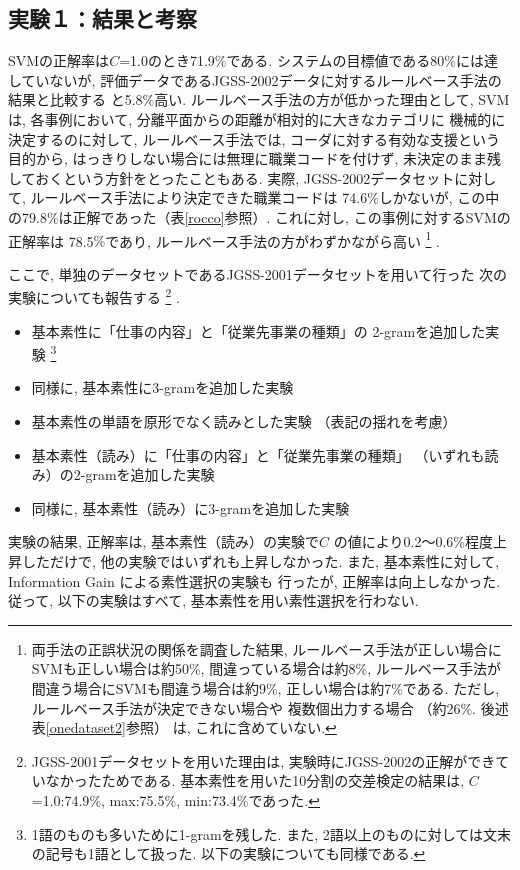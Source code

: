 \documentclass{nlp}
\begin{document}
\subsection{実験１：結果と考察}
SVMの正解率は$C$=1.0のとき71.9$\%$である. 
システムの目標値である80$\%$には達していないが, 
評価データであるJGSS-2002データに対するルールベース手法の結果と比較する
と5.8$\%$高い. 
ルールベース手法の方が低かった理由として, 
SVMは, 各事例において, 
分離平面からの距離が相対的に大きなカテゴリに
機械的に決定するのに対して, 
ルールベース手法では, 
コーダに対する有効な支援という目的から, 
はっきりしない場合には無理に職業コードを付けず, 
未決定のまま残しておくという方針をとったこともある. 
実際, JGSS-2002データセットに対して, 
ルールベース手法により決定できた職業コードは
74.6$\%$しかないが, 
この中の79.8$\%$は正解であった（表\ref{rocco}参照）. 
これに対し, この事例に対するSVMの正解率は
78.5$\%$であり, 
ルールベース手法の方がわずかながら高い
\footnote{
両手法の正誤状況の関係を調査した結果, 
ルールベース手法が正しい場合にSVMも正しい場合は約50$\%$, 
間違っている場合は約8$\%$, 
ルールベース手法が間違う場合にSVMも間違う場合は約9$\%$,
正しい場合は約7$\%$である. 
ただし, ルールベース手法が決定できない場合や
複数個出力する場合
（約26$\%$. 後述表\ref{onedataset2}参照）
は, これに含めていない. }
. 
 
ここで, 単独のデータセットであるJGSS-2001データセットを用いて行った
次の実験についても報告する
\footnote{JGSS-2001データセットを用いた理由は, 
実験時にJGSS-2002の正解ができていなかったためである. 
基本素性を用いた10分割の交差検定の結果は, 
$C$=1.0:74.9$\%$, max:75.5$\%$, min:73.4$\%$であった. }
. 

\begin{itemize}
\item 基本素性に「仕事の内容」と「従業先事業の種類」の
2-gramを追加した実験
\footnote{1語のものも多いために1-gramを残した. 
また, 2語以上のものに対しては文末の記号も1語として扱った. 
以下の実験についても同様である. }
\item 同様に, 基本素性に3-gramを追加した実験
\item 基本素性の単語を原形でなく読みとした実験
（表記の揺れを考慮）
\item 基本素性（読み）に「仕事の内容」と「従業先事業の種類」
（いずれも読み）の2-gramを追加した実験
\item 同様に, 基本素性（読み）に3-gramを追加した実験
\end{itemize}

実験の結果, 正解率は, 
基本素性（読み）の実験で$C$
の値により0.2〜0.6$\%$程度上昇しただけで, 
他の実験ではいずれも上昇しなかった. 
また, 基本素性に対して, Information Gain
\cite{Sebastiani02}
による素性選択の実験も
行ったが, 正解率は向上しなかった. 
従って, 以下の実験はすべて, 
基本素性を用い素性選択を行わない. 
\end{document}
